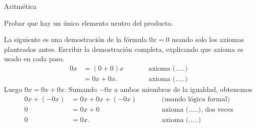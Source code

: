 \begin{section}{Aritmética}
\begin{enumex}
\item \label{ej-elem-neutro-prod} Probar que hay un único elemento neutro del producto.

\item \label{ej0a}
La siguiente es una demostración de la fórmula $0x=0$ usando solo los axiomas planteados antes. Escribir la demostración completa, explicando que axioma es usado en cada paso.
$$\begin{aligned}
0x &= (0+0)x &\qquad &\mbox{axioma (.....)}\\  
&=0x+0x. &\qquad &\mbox{axioma (.....)}
\end{aligned}$$
Luego $0x =0x+0x$. Sumando $-0x$ a ambos miembros de la igualdad, obtenemos 
$$\begin{aligned}
0x +(-0x) &= 0x+0x+(-0x) &\qquad &\mbox{(usando lógica formal)}\\  
0 &= 0x+0 &\qquad &\mbox{axioma (.....), dos veces}\\  
0 &=0x. &\qquad &\mbox{axioma (.....)}
\end{aligned}$$
\end{enumex}

\end{section}



